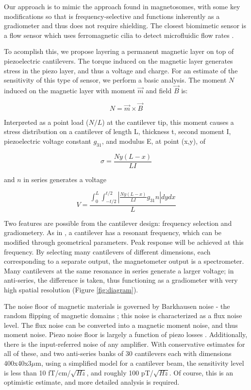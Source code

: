 Our approach is to mimic the approach found in magnetosomes, with some key modifications so that is frequency-selective and functions inherently as a gradiometer and thus does not require shielding. The closest biomimetic sensor is a flow sensor which uses ferromagnetic cilia to detect microfluidic flow rates \cite{alfadhel2014magnetic}.

To acomplish this, we propose layering a permanent magnetic layer on top of piezoelectric cantilevers. The torque induced on the magnetic layer generates stress in the piezo layer, and thus a voltage and charge. For an estimate of the sensitivity of this type of sensor, we perform a basic analysis. The moment $N$ induced on the magnetic layer with moment $\vec{m}$ and field $\vec{B}$ is:

$$  N=\vec{m} \times \vec{B} $$

Interpreted as a point load ($N/L$) at the cantilever tip, this moment causes a stress distribution on a cantilever of length L, thickness t, second moment I, piezoelectric voltage constant $g_{31}$, and modulus E, at point (x,y), of

$$ \sigma=\frac{Ny(L-x)}{LI} $$

and $n$ in series generates a voltage

$$ V=\frac{\int_0^L\int_{-t/2}^{t/2}\left|\frac{Ny(L-x)}{LI}g_{31}n\right|dydx}{L} $$

Two features are possible from the cantilever design: frequency selection and gradiometery. As in \cite{shen2008design}, a cantilever has a resonant frequency, which can be modified through geometrical parameters. Peak response will be achieved at this frequency. By selecting many cantilevers of different dimensions, each corresponding to a separate output, the magnetometer output is a spectrometer. Many cantilevers at the same resonance in series generate a larger voltage; in anti-series, the difference is taken, thus functioning as a gradiometer with very high spatial resolution (Figure \ref{fig:diagram}).

The noise floor of magnetic materials is governed by Barkhausen noise - the random flipping of magnetic domains \cite{butta2012sources}; this noise is characterized as a flux noise level. The flux noise can be converted into a magnetic moment noise, and thus moment noise. Piezo noise floor is largely a function of piezo losses \cite{levinzon2004fundamental}. Additionally, there is the input-referred noise of any amplifier. With conservative estimates for all of these, and two anti-series banks of 30 cantilevers each with dimensions 400x40x3$\mu$m, using a simplified model for a cantilever beam, the sensitivity level is less than 10 fT/cm/$\sqrt{Hz}$, and roughly 100 pT/$\sqrt{Hz}$. Of course, this is an optimistic estimate, and more detailed analysis is required. 

